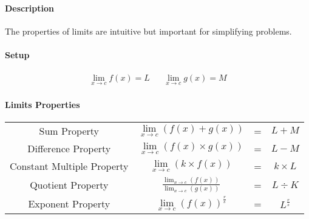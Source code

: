 \documentclass[12pt]{article}
\begin{document}
\paragraph{Description} The properties of limits are intuitive but important for simplifying problems.

\paragraph{Setup}
\begingroup \large
\begin{align*}
  \lim_{x \to c} f(x) = L && \lim_{x \to c} g(x) = M
\end{align*}
\endgroup

\paragraph{Limits Properties}
\begin{center}
\LARGE {} %
\begin{tabular}{cccc}
  Sum Property & $\lim\limits_{x \to c} (f(x) + g(x))$ & = & $L + M$ \\
  Difference Property & $\lim\limits_{x \to c} (f(x) \times g(x))$ &
  = & $L -M$ \\
  Constant Multiple Property & $\lim\limits_{x \to c} (k \times f(x))$ &
  = & $k \times L$ \\
  Quotient Property & \LARGE $\frac{\lim_{x \to c} (f(x))}
  {\lim_{x \to c} (g(x))}$ & = & $L \div K$ \\
  Exponent Property & $\lim\limits_{x \to c} {(f(x))}^{\frac{r}{s}}$ &
  = & $L^{\frac{r}{s}}$
\end{tabular}
\end{center}
\end{document}
